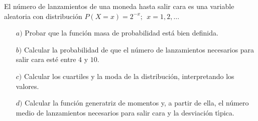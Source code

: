 \problem 

El n{\'u}mero de lanzamientos de una moneda hasta salir cara es  una variable aleatoria
con distribuci{\'o}n  $P(X = x)  =  2^{-x};\ \ x = 1, 2, \ldots$
\begin{enumerate}
	\item [$a)$] Probar que la funci{\'o}n masa de probabilidad est{\'a} bien definida.
	\item [$b)$] Calcular la probabilidad de que el n{\'u}mero de lanzamientos necesarios para salir cara est{\'e} entre $4$ y $10$.
	\item [$c)$] Calcular los cuartiles y la moda de la distribuci{\'o}n, interpretando los valores.
	\item [$d)$] Calcular la funci{\'o}n generatriz de momentos y, a partir de ella, el n{\'u}mero medio de lanzamientos necesarios para salir cara y la desviaci{\'o}n t{\'\i}pica.


\end{enumerate}
